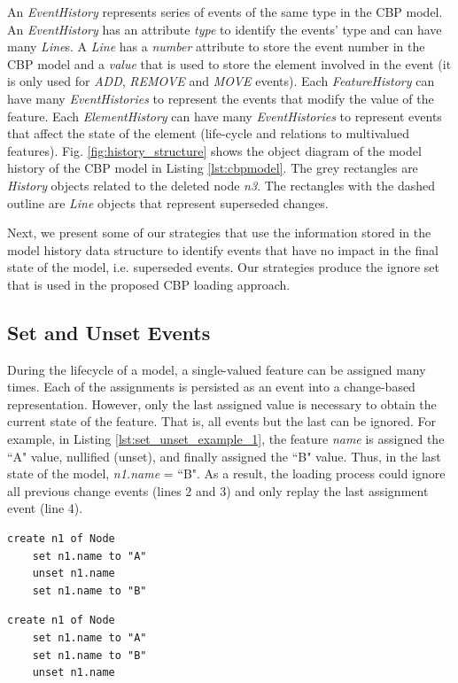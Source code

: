 \documentclass{llncs}
\begin{document}
An \emph{EventHistory} represents series of events of the same type in the CBP model.
An \emph{EventHistory} has an attribute \emph{type} to identify the events' type and can have many \emph{Line}s.
A \emph{Line} has a \emph{number} attribute to store the event number in the CBP model and a \emph{value} that is used to store the element involved in the event (it is only used for \emph{ADD}, \emph{REMOVE} and \emph{MOVE} events). Each \emph{FeatureHistory} can have many \emph{EventHistories} to represent the events that modify the value of the feature.
Each \emph{ElementHistory} can have many \emph{EventHistories} to represent events that affect the state of the element (life-cycle and relations to multivalued features).
Fig. \ref{fig:history_structure} shows the object diagram of the model history of the CBP model in Listing \ref{lst:cbpmodel}. The grey rectangles are \emph{History} objects related to the deleted node \emph{n3}. The rectangles with the dashed outline are \emph{Line} objects that represent superseded changes. 

Next, we present some of our strategies that use the information stored in the model history data structure to identify events that have no impact in the final state of the model, i.e. superseded events. Our strategies produce the ignore set that is used in the proposed CBP loading approach.

\subsection{Set and Unset Events}
\label{subsec:set_and_unset_operations}
During the lifecycle of a model, a single-valued feature can be assigned many times.
Each of the assignments is persisted as an event into a change-based representation.
However, only the last assigned value is necessary to obtain the current state of the feature. 
That is, all events but the last can be ignored.
For example, in Listing \ref{lst:set_unset_example_1}, the feature \emph{name} is assigned the ``A" value, nullified (unset), and finally assigned the ``B" value.
Thus, in the last state of the model, \emph{n1.name} = ``B".
As a result, the loading process could ignore all previous change events (lines 2 and 3) and only replay the last assignment event (line 4). 

\noindent
\begin{minipage}[t]{0.49\linewidth}
    \begin{lstlisting}[style=eol,caption={The CBP representation of attribute \emph{name} assignments.},label=lst:set_unset_example_1]
    create n1 of Node
    set n1.name to "A"
    unset n1.name
    set n1.name to "B"
    \end{lstlisting}
\end{minipage}
\hfill
\begin{minipage}[t]{0.49\linewidth}
    \begin{lstlisting}[style=eol,caption={The CBP representation of attribute \emph{name} assignments.},label=lst:set_unset_example_2]
    create n1 of Node
    set n1.name to "A"
    set n1.name to "B"
    unset n1.name
    \end{lstlisting}
\end{minipage}
\end{document}
